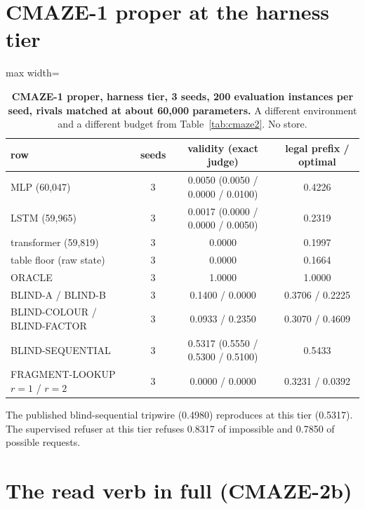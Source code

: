 \documentclass{article} %
\begin{document}
\section{CMAZE-1 proper at the harness tier}
\label{app:cmaze1}

\begin{table}[h]
\centering\small
\caption{\textbf{CMAZE-1 proper, harness tier, 3 seeds, 200 evaluation instances per seed, rivals %
matched at about 60,000 parameters.} A different environment and a different budget from %
Table~\ref{tab:cmaze2}. No store.}
\label{tab:cmaze1}
\begin{adjustbox}{max width=\linewidth}\begin{tabular}{lccc}
\toprule
row & seeds & validity (exact judge) & legal prefix / optimal \\
\midrule
MLP (60,047) & 3 & 0.0050 (0.0050 / 0.0000 / 0.0100) & 0.4226 \\
LSTM (59,965) & 3 & 0.0017 (0.0000 / 0.0000 / 0.0050) & 0.2319 \\
transformer (59,819) & 3 & 0.0000 & 0.1997 \\
table floor (raw state) & 3 & 0.0000 & 0.1664 \\
ORACLE & 3 & 1.0000 & 1.0000 \\
BLIND-A / BLIND-B & 3 & 0.1400 / 0.0000 & 0.3706 / 0.2225 \\
BLIND-COLOUR / BLIND-FACTOR & 3 & 0.0933 / 0.2350 & 0.3070 / 0.4609 \\
BLIND-SEQUENTIAL & 3 & 0.5317 (0.5550 / 0.5300 / 0.5100) & 0.5433 \\
FRAGMENT-LOOKUP $r=1$ / $r=2$ & 3 & 0.0000 / 0.0000 & 0.3231 / 0.0392 \\
\bottomrule
\end{tabular}\end{adjustbox}
\end{table}

\noindent The published blind-sequential tripwire (0.4980) reproduces at this tier (0.5317). The
supervised refuser at this tier refuses 0.8317 of impossible and 0.7850 of possible requests.

\section{The read verb in full (CMAZE-2b)}
\label{app:verb}
\end{document}
